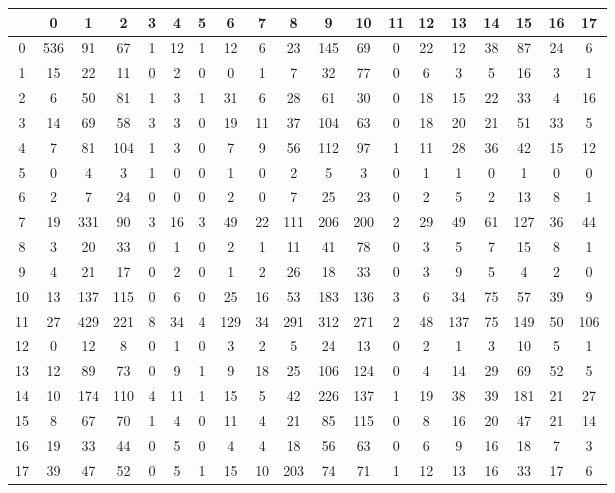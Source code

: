 \documentclass[german,version-2020-11]{uzl-thesis}
\begin{document}
\begin{enumerate}
\begin{center}
\begin{tabular}{ccccccccccccccccccc}
\hline
\hline 
&0&1&2&3&4&5&6&7&8&9&10&11&12&13&14&15&16&17\\
\hline
0&536& 91& 67& 1& 12& 1& 12& 6& 23& 145& 69& 0& 22& 12& 38& 87& 24& 6\\
\hline
1&15& 22& 11& 0& 2& 0& 0& 1& 7& 32& 77& 0& 6& 3& 5& 16& 3& 1\\ 
\hline
2&6& 50& 81& 1& 3& 1& 31& 6& 28& 61& 30& 0& 18& 15& 22& 33& 4& 16\\
\hline
3&14& 69& 58& 3& 3& 0& 19& 11& 37& 104& 63& 0& 18& 20& 21& 51& 33& 5\\
\hline
4&7& 81& 104& 1& 3& 0& 7& 9& 56& 112& 97& 1& 11& 28& 36& 42& 15& 12\\ 
\hline
5&0& 4& 3& 1& 0& 0& 1& 0& 2& 5& 3& 0& 1& 1& 0& 1& 0& 0\\
\hline
6&2& 7& 24& 0& 0& 0& 2& 0& 7& 25& 23& 0& 2& 5& 2& 13& 8& 1\\ 
\hline
7&19& 331& 90& 3& 16& 3& 49& 22& 111& 206& 200& 2& 29& 49& 61& 127& 36& 44\\ 
\hline
8&3& 20& 33& 0& 1& 0& 2& 1& 11& 41& 78& 0& 3& 5& 7& 15& 8& 1\\
\hline
9&4& 21& 17& 0& 2& 0& 1& 2& 26& 18& 33& 0& 3& 9& 5& 4& 2& 0\\
\hline
10&13& 137& 115& 0& 6& 0& 25& 16& 53& 183& 136& 3& 6& 34& 75& 57& 39& 9\\ 
\hline
11&27& 429& 221& 8& 34& 4& 129& 34& 291& 312& 271& 2& 48& 137& 75& 149& 50& 106\\ 
\hline
12&0& 12& 8& 0& 1& 0& 3& 2& 5& 24& 13& 0& 2& 1& 3& 10& 5& 1\\ 
\hline
13&12& 89& 73& 0& 9& 1& 9& 18& 25& 106& 124& 0& 4& 14& 29& 69& 52& 5\\ 
\hline
14&10& 174& 110& 4& 11& 1& 15& 5& 42& 226& 137& 1& 19& 38& 39& 181& 21& 27\\
\hline
15&8& 67& 70& 1& 4& 0& 11& 4& 21& 85& 115& 0& 8& 16& 20& 47& 21& 14\\ 
\hline
16&19& 33& 44& 0& 5& 0& 4& 4& 18& 56& 63& 0& 6& 9& 16& 18& 7& 3\\ 
\hline
17&39& 47& 52& 0& 5& 1& 15& 10& 203& 74& 71& 1& 12& 13& 16& 33& 17& 6\\
\hline
\hline
\end{tabular}
\end{center}\\


\end{enumerate}
\end{document}
